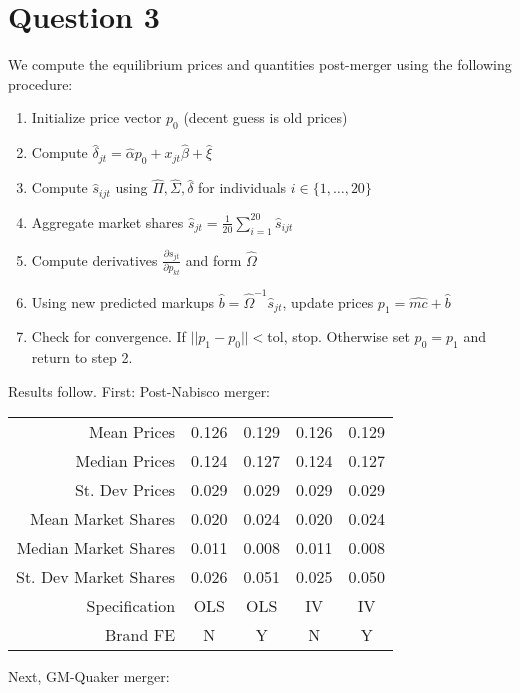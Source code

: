 \documentclass[11pt]{article} %
\begin{document}
\section{Question 3}
We compute the equilibrium prices and quantities post-merger using the following procedure:
\begin{enumerate}
\item Initialize price vector $p_0$ (decent guess is old prices)
\item Compute $\hat{\delta}_{jt} = \hat{\alpha}p_0 + x_{jt}\hat{\beta} + \hat{\xi}$
\item Compute $\hat{s}_{ijt}$ using $\hat{\Pi}, \hat{\Sigma}, \hat{\delta}$ for individuals $i \in \{1,\dots,20\}$
\item Aggregate market shares $\hat{s}_{jt} = \frac{1}{20}\sum_{i=1}^{20} \hat{s}_{ijt}$
\item Compute derivatives $\frac{\partial s_{jt}}{\partial p_{kt}}$ and form $\hat{\Omega}$
\item Using new predicted markups $\hat{b} = \hat{\Omega}^{-1}\hat{s}_{jt}$, update prices $p_1 = \hat{mc} + \hat{b}$
\item Check for convergence. If $||p_1 - p_0||<$tol, stop. Otherwise set $p_0 = p_1$ and return to step 2. 
\end{enumerate}

Results follow. First: Post-Nabisco merger:

\begin{center}
\begin{tabular}{r |c c c c}
\hline \hline
Mean Prices & 0.126 & 0.129 & 0.126 & 0.129 \\
Median Prices & 0.124 & 0.127 & 0.124 & 0.127 \\
St. Dev Prices & 0.029 & 0.029 & 0.029 & 0.029 \\
Mean Market Shares & 0.020 & 0.024 & 0.020 & 0.024 \\
Median Market Shares & 0.011 & 0.008 & 0.011 & 0.008 \\
St. Dev Market Shares & 0.026 & 0.051 & 0.025 & 0.050 \\
\hline
Specification & OLS & OLS & IV & IV \\
Brand FE & N & Y & N & Y \\
\hline
\end{tabular}
\end{center}

Next, GM-Quaker merger:
\end{document}
